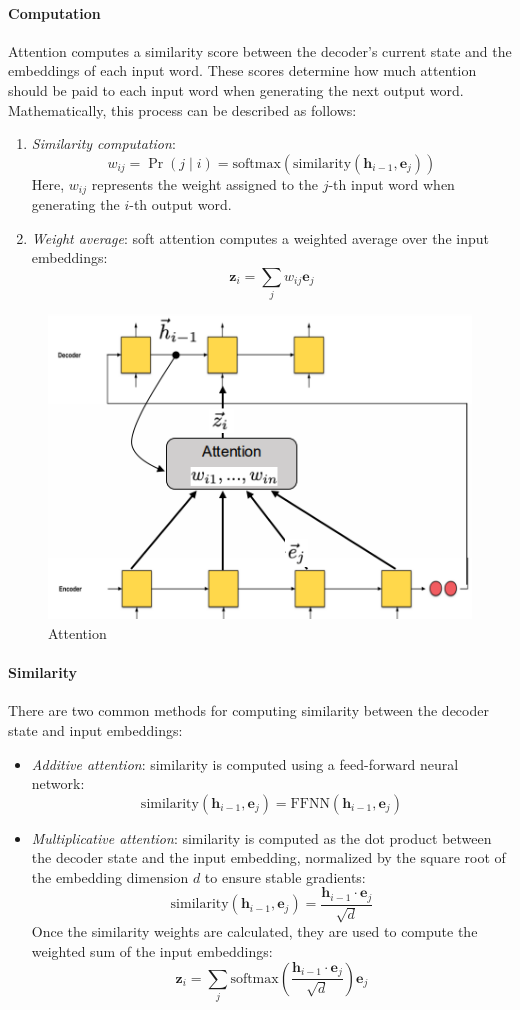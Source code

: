 \paragraph*{Computation}
Attention computes a similarity score between the decoder's current state and the embeddings of each input word. 
These scores determine how much attention should be paid to each input word when generating the next output word. 
Mathematically, this process can be described as follows:
\begin{enumerate}
    \item \textit{Similarity computation}: 
        \[w_{ij}=\Pr(j\mid i)=\text{softmax}(\text{similarity}(\textbf{h}_{i-1},\textbf{e}_j))\]
        Here, $w_{ij}$ represents the weight assigned to the $j$-th input word when generating the $i$-th output word.
    \item \textit{Weight average}: soft attention computes a weighted average over the input embeddings:
        \[\textbf{z}_i=\sum_jw_{ij}\textbf{e}_j\]
\end{enumerate}
\begin{figure}[H]
    \centering
    \includegraphics[width=0.5\linewidth]{images/nlp4.png}
    \caption{Attention}
\end{figure}

\paragraph*{Similarity}
There are two common methods for computing similarity between the decoder state and input embeddings:
\begin{itemize}
    \item \textit{Additive attention}: similarity is computed using a feed-forward neural network:
        \[\text{similarity}(\textbf{h}_{i-1},\textbf{e}_j)=\text{FFNN}(\textbf{h}_{i-1},\textbf{e}_j)\]    
    \item \textit{Multiplicative attention}: similarity is computed as the dot product between the decoder state and the input embedding, normalized by the square root of the embedding dimension $d$ to ensure stable gradients:
        \[\text{similarity}(\textbf{h}_{i-1},\textbf{e}_j)=\dfrac{\textbf{h}_{i-1}\cdot\textbf{e}_j}{\sqrt{d}}\]    
        Once the similarity weights are calculated, they are used to compute the weighted sum of the input embeddings:
        \[\textbf{z}_i=\sum_j\text{softmax}\left(\dfrac{\textbf{h}_{i-1}\cdot\textbf{e}_j}{\sqrt{d}}\right)\textbf{e}_j\]

\end{itemize}

